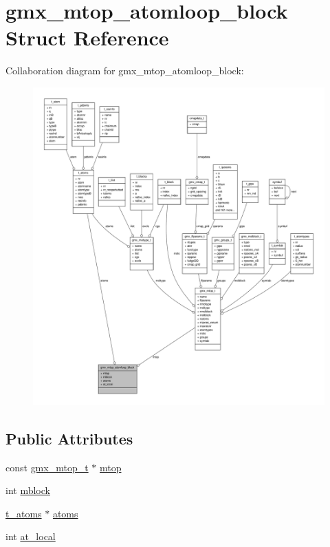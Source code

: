 \hypertarget{structgmx__mtop__atomloop__block}{\section{gmx\-\_\-mtop\-\_\-atomloop\-\_\-block \-Struct \-Reference}
\label{structgmx__mtop__atomloop__block}
}


\-Collaboration diagram for gmx\-\_\-mtop\-\_\-atomloop\-\_\-block\-:
\nopagebreak
\begin{figure}[H]
\begin{center}
\leavevmode
\includegraphics[width=350pt]{structgmx__mtop__atomloop__block__coll__graph}
\end{center}
\end{figure}
\subsection*{\-Public \-Attributes}
\begin{DoxyCompactItemize}
\item 
const \hyperlink{structgmx__mtop__t}{gmx\-\_\-mtop\-\_\-t} $\ast$ \hyperlink{structgmx__mtop__atomloop__block_a0705987dcce275900bf3e7e506363d0c}{mtop}
\item 
int \hyperlink{structgmx__mtop__atomloop__block_afc6f74d7410bd8b39c29ba0d0d7410a0}{mblock}
\item 
\hyperlink{structt__atoms}{t\-\_\-atoms} $\ast$ \hyperlink{structgmx__mtop__atomloop__block_a990d1977add90247a4c332339492fd5e}{atoms}
\item 
int \hyperlink{structgmx__mtop__atomloop__block_ab9ff910791ddef2e62cb472210150831}{at\-\_\-local}
\end{DoxyCompactItemize}


